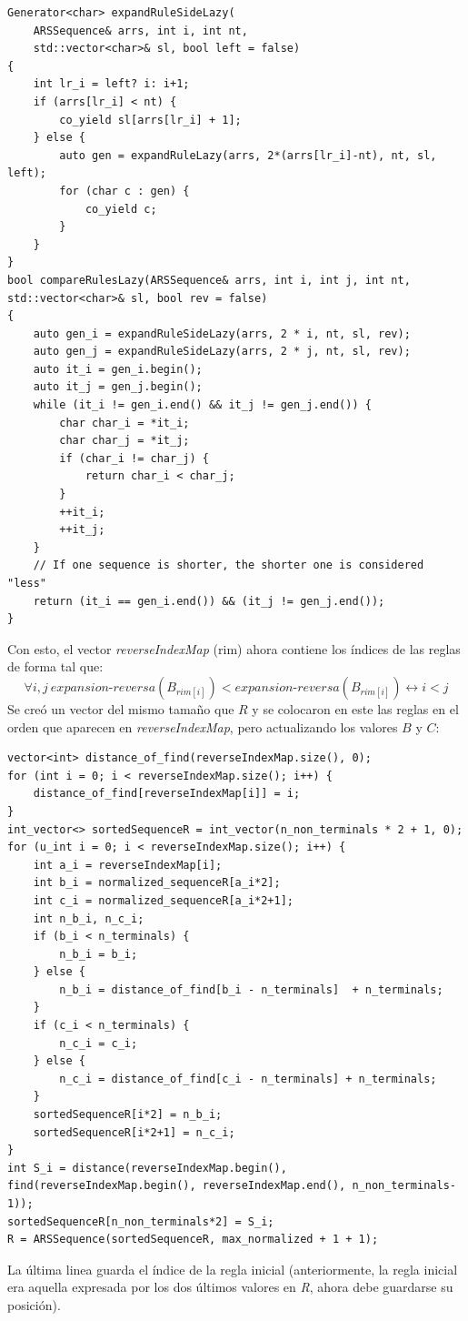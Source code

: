 \begin{lstlisting}[style=cppstyle, caption={Comparación perezosa}, label={lst:cmp}] 
Generator<char> expandRuleSideLazy(
    ARSSequence& arrs, int i, int nt,
    std::vector<char>& sl, bool left = false)
{    
    int lr_i = left? i: i+1;
    if (arrs[lr_i] < nt) {
        co_yield sl[arrs[lr_i] + 1];
    } else {
        auto gen = expandRuleLazy(arrs, 2*(arrs[lr_i]-nt), nt, sl, left);
        for (char c : gen) {
            co_yield c;
        }
    }
}
bool compareRulesLazy(ARSSequence& arrs, int i, int j, int nt, std::vector<char>& sl, bool rev = false) 
{
    auto gen_i = expandRuleSideLazy(arrs, 2 * i, nt, sl, rev);
    auto gen_j = expandRuleSideLazy(arrs, 2 * j, nt, sl, rev);
    auto it_i = gen_i.begin();
    auto it_j = gen_j.begin();
    while (it_i != gen_i.end() && it_j != gen_j.end()) {
        char char_i = *it_i;
        char char_j = *it_j;
        if (char_i != char_j) {
            return char_i < char_j;
        }
        ++it_i;
        ++it_j;
    }
    // If one sequence is shorter, the shorter one is considered "less"
    return (it_i == gen_i.end()) && (it_j != gen_j.end());
}
\end{lstlisting}

Con esto, el vector \textit{reverseIndexMap} (rim) ahora contiene los índices de las reglas de forma tal que:
\[\forall i,j\ expansion\text{-}reversa (B_{rim[i]}) < expansion\text{-}reversa (B_{rim[i]})  \longleftrightarrow i < j \]
Se creó un vector del mismo tamaño que $R$ y se colocaron en este las reglas en el orden que aparecen en \textit{reverseIndexMap}, pero actualizando los valores $B$ y $C$:
\begin{lstlisting}[style=cppstyle, caption={\textit{Nueva secuencia R}}, label={lst:sort2}] 
vector<int> distance_of_find(reverseIndexMap.size(), 0);
for (int i = 0; i < reverseIndexMap.size(); i++) {
    distance_of_find[reverseIndexMap[i]] = i;        
}
int_vector<> sortedSequenceR = int_vector(n_non_terminals * 2 + 1, 0);
for (u_int i = 0; i < reverseIndexMap.size(); i++) {        
    int a_i = reverseIndexMap[i]; 
    int b_i = normalized_sequenceR[a_i*2];
    int c_i = normalized_sequenceR[a_i*2+1];
    int n_b_i, n_c_i;
    if (b_i < n_terminals) {
        n_b_i = b_i;
    } else {
        n_b_i = distance_of_find[b_i - n_terminals]  + n_terminals;
    }
    if (c_i < n_terminals) {
        n_c_i = c_i;
    } else {
        n_c_i = distance_of_find[c_i - n_terminals] + n_terminals;
    }
    sortedSequenceR[i*2] = n_b_i; 
    sortedSequenceR[i*2+1] = n_c_i; 
} 
int S_i = distance(reverseIndexMap.begin(), find(reverseIndexMap.begin(), reverseIndexMap.end(), n_non_terminals-1));  
sortedSequenceR[n_non_terminals*2] = S_i; 
R = ARSSequence(sortedSequenceR, max_normalized + 1 + 1);
\end{lstlisting}
La última linea guarda el índice de la regla inicial (anteriormente, la regla inicial era aquella expresada por los dos últimos valores en \textit{R}, ahora debe guardarse su posición).

